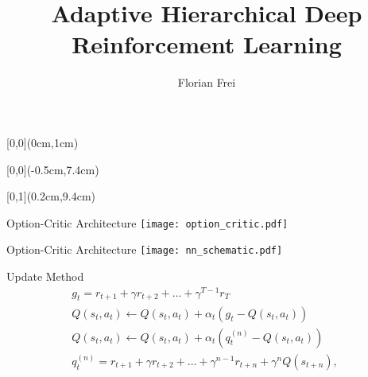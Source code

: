 \documentclass[hyperref={pdfpagelabels=false}]{beamer}
\title{Adaptive Hierarchical Deep Reinforcement Learning}
\author{Florian Frei}
\institute{ETH Zurich -- Distributed Computing Group -- www.disco.ethz.ch}
\begin{document}
{
\begin{frame}
	\begin{textblock*}{\paperwidth}[0,0](0cm,1cm)
		\begin{center}
			\textbf{\huge \inserttitle}
		\end{center}
	\end{textblock*}
	\begin{textblock*}{\paperwidth}[0,0](-0.5cm,7.4cm)
		\flushright
		\color{white}
		\itshape \insertauthor
	\end{textblock*}
	\begin{textblock*}{\paperwidth}[0,1](0.2cm,9.4cm)
		\flushleft
		\tiny \itshape \insertinstitute
	\end{textblock*}
\end{frame}
}


\begin{frame}{Option-Critic Architecture}
\texttt{[image: option\_critic.pdf]}
\end{frame}

\begin{frame}{Option-Critic Architecture}
\texttt{[image: nn\_schematic.pdf]}
\end{frame}

\begin{frame}{Update Method}
\begin{gather*}
g_t = r_{t+1} + \gamma r_{t+2} + \ldots + \gamma^{T-1} r_{T}\\
Q(s_t , a_t) \leftarrow Q(s_t , a_t) + \alpha_t(g_t - Q(s_t , a_t))\\
Q(s_t , a_t) \leftarrow Q(s_t , a_t) + \alpha_t(q^{(n)}_t - Q(s_t , a_t)) \\
q^{(n)}_t  = r_{t+1} + \gamma r_{t+2} + \ldots + \gamma^{n-1} r_{t+n} + \gamma^n Q(s_{t+n}) , \;
\end{gather*}
\end{frame}
\end{document}
